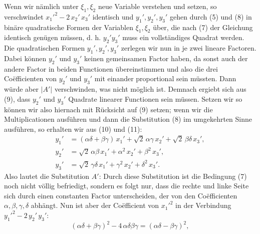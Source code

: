 
Wenn wir nämlich unter $\xi_1, \xi_2$ neue Variable verstehen und
setzen, so verschwindet $x_1'^2 - 2\,x_2'\,x_3'$ identisch und
$y_1', y_2', y_3'$ gehen durch (5) und (8) in binäre quadratische
Formen der Variablen $\xi_1, \xi_2$ über, die nach (7) der
Gleichung
identisch genügen müssen, d. h. $y_2' y_3'$ muss ein
vollständiges Quadrat werden. Die quadratischen Formen $y_1', y_2',
y_3'$ zerlegen wir nun in je zwei lineare Factoren. Dabei können
$y_2'$ und $y_3'$ keinen gemeinsamen Factor haben, da sonst auch
der andere Factor in beiden Functionen übereinstimmen und also
die drei Co\"efficienten von $y_2'$ und $y_3'$ mit einander
proportional sein müssten. Dann würde aber $|A'|$ verschwinden,
was nicht möglich ist. Demnach ergiebt sich aus (9), dass $y_2'$
und $y_3'$ Quadrate linearer Functionen sein müssen. Setzen wir
so können wir also hiernach mit Rücksicht auf (9)
setzen; wenn wir die Multiplicationen ausführen und dann die
Substitution (8) im umgekehrten Sinne ausführen, so erhalten wir
aus (10) und (11):
\[
\begin{aligned}
y_1' &= (\alpha\delta + \beta\gamma)\,x_1' + \sqrt{2}\,\alpha\gamma\,x_2' + \sqrt{2}\,\beta\delta\,x_3', \\
y_2' &= \sqrt{2}\,\alpha\beta\,x_1' + \alpha^2\,x_2' + \beta^2\,x_3', \\
y_3' &= \sqrt{2}\,\gamma\delta\,x_1' + \gamma^2\,x_2' + \delta^2\,x_3'.
\end{aligned}
\]
Also lautet die Substitution $A'$:
Durch diese Substitution ist die Bedingung (7) noch nicht völlig
befriedigt, sondern es folgt nur, dass die rechte und linke Seite
sich durch einen constanten Factor unterscheiden, der von den
Co\"efficienten $\alpha, \beta, \gamma, \delta$ abhängt. Nun ist
aber der Co\"efficient von $x_1'^2$ in der Verbindung
$y_1'^2 - 2\,y_2'\,y_3'$:
\[
(\alpha\delta + \beta\gamma)^2 - 4\,\alpha\delta\beta\gamma = (\alpha\delta - \beta\gamma)^2,
\]
